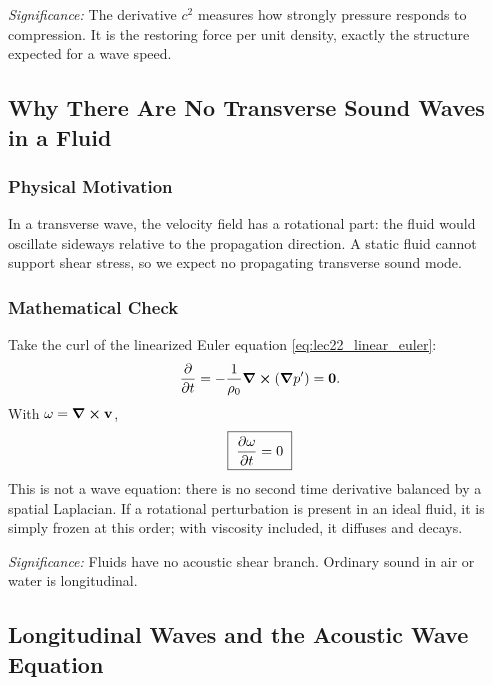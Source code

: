 \documentclass[../main.tex]{subfiles}
\begin{document}
\textit{Significance:} The derivative $c^2$ measures how strongly pressure
responds to compression. It is the restoring force per unit density, exactly the
structure expected for a wave speed.

\subsection{Why There Are No Transverse Sound Waves in a Fluid}\label{sec:lec22:no-transverse}

\subsubsection*{Physical Motivation}
In a transverse wave, the velocity field has a rotational part: the fluid would
oscillate sideways relative to the propagation direction. A static fluid cannot
support shear stress, so we expect no propagating transverse sound mode.

\subsubsection*{Mathematical Check}
Take the curl of the linearized Euler equation
\eqref{eq:lec22_linear_euler}:
\begin{equation}
  \pdv{}{t}(\curl\mathbf{v})
  =-\frac{1}{\rho_0}\curl(\grad p')=\mathbf{0}.
  \label{eq:lec22_vorticity_linear}
\end{equation}
With $\mathbf{\omega}=\curl\mathbf{v}$,
\begin{equation}
  \boxed{\;\pdv{\mathbf{\omega}}{t}=0\;}
  \label{eq:lec22_no_transverse}
\end{equation}
This is not a wave equation: there is no second time derivative balanced by a
spatial Laplacian. If a rotational perturbation is present in an ideal fluid, it
is simply frozen at this order; with viscosity included, it diffuses and
decays.

\textit{Significance:} Fluids have no acoustic shear branch. Ordinary sound in
air or water is longitudinal.

\subsection{Longitudinal Waves and the Acoustic Wave Equation}\label{sec:lec22:wave-equation}
\end{document}
